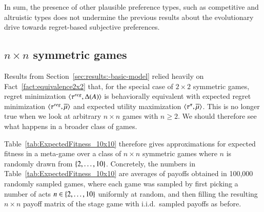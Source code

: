 \documentclass[fleqn,reqno,11pt]{article}
\begin{document}
In sum, the presence of other plausible preference types, such as competitive and altruistic
types does not undermine the previous results about the evolutionary drive towards regret-based
subjective preferences.


                                   
\subsection{$n \times n$ symmetric games}
\label{sec:n-times-n}

Results from Section~\ref{sec:results:-basic-model} relied heavily on
Fact~\ref{fact:equivalence2x2} that, for the special case of $2 \times 2$ symmetric games,
regret minimization $\left \langle \tau^{reg}, \Delta(A)\right\rangle$ is behaviorally equivalent with expected
regret minimization $\left \langle \tau^{reg}, \overline{\mu}\right\rangle$ and expected utility maximization
$\left \langle \tau^{\pi}, \overline{\mu}\right\rangle$. This is no longer true when we look at arbitrary $n \times n$
games with $n \ge 2$. We should therefore see what happens in a broader class of games.

Table~\ref{tab:ExpectedFitness_10x10} therefore gives approximations for expected fitness in a
meta-game over a class of $n \times n$ symmetric games where $n$ is randomly drawn from
$\left\{2, \dots, 10\right\}$. Concretely, the numbers in Table~\ref{tab:ExpectedFitness_10x10} are
averages of payoffs obtained in 100,000 randomly sampled games, where each game was sampled by
first picking a number of acts $n \in \left\{2, \dots, 10\right\}$ uniformly at random, and then filling
the resulting $n \times n$ payoff matrix of the stage game with i.i.d.~sampled payoffs as
before.
\end{document}

